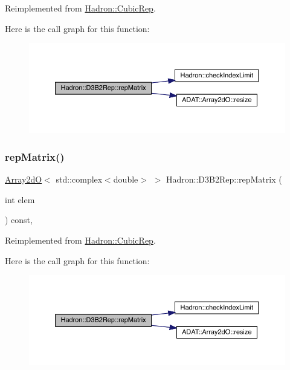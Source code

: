 Reimplemented from \mbox{\hyperlink{structHadron_1_1CubicRep_ac5d7e9e6f4ab1158b5fce3e4ad9e8005}{Hadron\+::\+Cubic\+Rep}}.

Here is the call graph for this function\+:
\nopagebreak
\begin{figure}[H]
\begin{center}
\leavevmode
\includegraphics[width=350pt]{d3/d61/structHadron_1_1D3B2Rep_a3e946b6e27ca026d8e7b1bcd02471deb_cgraph}
\end{center}
\end{figure}
\mbox{\label{structHadron_1_1D3B2Rep_a3e946b6e27ca026d8e7b1bcd02471deb}} 
\subsubsection{\texorpdfstring{repMatrix()}{repMatrix()}\hspace{0.1cm}{\footnotesize\ttfamily [3/3]}}
{\footnotesize\ttfamily \mbox{\hyperlink{classADAT_1_1Array2dO}{Array2dO}}$<$ std\+::complex$<$double$>$ $>$ Hadron\+::\+D3\+B2\+Rep\+::rep\+Matrix (\begin{DoxyParamCaption}\item[{int}]{elem }\end{DoxyParamCaption}) const\hspace{0.3cm}{\ttfamily [inline]}, {\ttfamily [virtual]}}



Reimplemented from \mbox{\hyperlink{structHadron_1_1CubicRep_ac5d7e9e6f4ab1158b5fce3e4ad9e8005}{Hadron\+::\+Cubic\+Rep}}.

Here is the call graph for this function\+:
\nopagebreak
\begin{figure}[H]
\begin{center}
\leavevmode
\includegraphics[width=350pt]{d3/d61/structHadron_1_1D3B2Rep_a3e946b6e27ca026d8e7b1bcd02471deb_cgraph}
\end{center}
\end{figure}


